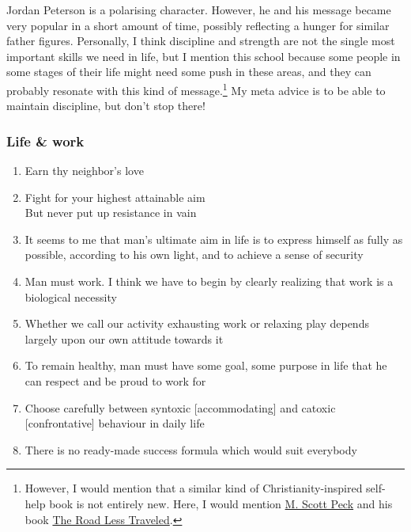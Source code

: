 \documentclass{article}
\begin{document}
\vspace{12pt}

Jordan Peterson is a polarising character. However, he and his message became very popular in a short amount of time, possibly reflecting a hunger for similar father figures. Personally, I think discipline and strength are not the single most important skills we need in life, but I mention this school because some people in some stages of their life might need some push in these areas, and they can probably resonate with this kind of message.\footnote{However, I would mention that a similar kind of Christianity-inspired self-help book is not entirely new. Here, I would mention \href{https://en.wikipedia.org/wiki/M._Scott_Peck}{M. Scott Peck} and his book \href{https://www.goodreads.com/book/show/347852.The_Road_Less_Traveled}{The Road Less Traveled}.} 
My meta advice is to be able to maintain discipline, but don't stop there!

\subsubsection{Life \& work}

\begin{enumerate}
    \item Earn thy neighbor’s love
    \item Fight for your highest attainable aim \\
    But never put up resistance in vain
    \item It seems to me that man's ultimate aim in life is to express himself as fully as possible, according to his own light, and to achieve a sense of security
    \item Man must work. I think we have to begin by clearly realizing that work is a biological necessity
    \item Whether we call our activity exhausting work or relaxing play depends largely upon our own attitude towards it
    \item To remain healthy, man must have some goal, some purpose in life that he can respect and be proud to work for
    \item Choose carefully between syntoxic [accommodating] and catoxic [confrontative] behaviour in daily life
    \item There is no ready-made success formula which would suit everybody
\end{enumerate}
\end{document}
